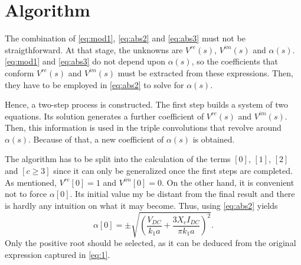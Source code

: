 \documentclass[conference]{IEEEtran}
\begin{document}
\section{Algorithm}\label{algoritme}
The combination of \eqref{eq:mod1}, \eqref{eq:abs2} and \eqref{eq:abs3} must not be straigthforward. At that stage, the unknowns are $V^{re}(s)$, $V^{im}(s)$ and $\alpha(s)$. \eqref{eq:mod1} and \eqref{eq:abs3} do not depend upon $\alpha(s)$, so the coefficients that conform $V^{re}(s)$ and $V^{im}(s)$ must be extracted from these expressions. Then, they have to be employed in \eqref{eq:abs2} to solve for $\alpha(s)$. 

Hence, a two-step process is constructed. The first step builds a system of two equations. Its solution generates a further coefficient of $V^{re}(s)$ and $V^{im}(s)$. Then, this information is used in the triple convolutions that revolve around $\alpha(s)$. Because of that, a new coefficient of $\alpha(s)$ is obtained. 


The algorithm has to be split into the calculation of the terms $[0]$, $[1]$, $[2]$ and $[c\geq 3]$ since it can only be generalized once the first steps are completed. 
As mentioned, $V^{re}[0]=1$ and $V^{im}[0]=0$. On the other hand, it is convenient not to force $\alpha[0]$. Its initial value my be distant from the final result and there is hardly any intuition on what it may become. Thus, using \eqref{eq:abs2} yields
\begin{equation}
  \alpha[0] = \pm\sqrt{\left(\frac{V_{DC}}{k_1a}+\frac{3X_cI_{DC}}{\pi k_1a}\right)^2}.
  \label{eq:alpha0}
\end{equation}
Only the positive root should be selected, as it can be deduced from the original expression captured in \eqref{eq:1}. 
\end{document}
